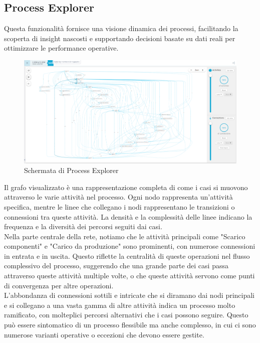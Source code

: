 \documentclass{article}
\begin{document}
\subsection{Process Explorer}
Questa funzionalità fornisce una visione dinamica dei processi, facilitando la scoperta di insight nascosti e supportando decisioni basate su dati reali per ottimizzare le performance operative.\\
\begin{figure}[H]
    \centering
    \includegraphics[width=\textwidth]{imgCelonis/DatiReali/ProcessExplorer.png}
    \caption{Schermata di Process Explorer}
    \label{fig:schermata-Process-Explorer}
\end{figure}
Il grafo visualizzato è una rappresentazione completa di come i casi si muovono attraverso le varie attività nel processo. Ogni nodo rappresenta un'attività specifica, mentre le linee che collegano i nodi rappresentano le transizioni o connessioni tra queste attività. La densità e la complessità delle linee indicano la frequenza e la diversità dei percorsi seguiti dai casi.\\
Nella parte centrale della rete, notiamo che le attività principali come "Scarico componenti" e "Carico da produzione" sono prominenti, con numerose connessioni in entrata e in uscita. Questo riflette la centralità di queste operazioni nel flusso complessivo del processo, suggerendo che una grande parte dei casi passa attraverso queste attività multiple volte, o che queste attività servono come punti di convergenza per altre operazioni.\\
L'abbondanza di connessioni sottili e intricate che si diramano dai nodi principali e si collegano a una vasta gamma di altre attività indica un processo molto ramificato, con molteplici percorsi alternativi che i casi possono seguire. Questo può essere sintomatico di un processo flessibile ma anche complesso, in cui ci sono numerose varianti operative o eccezioni che devono essere gestite.\\
\end{document}
